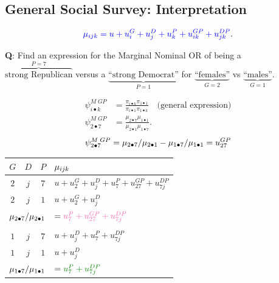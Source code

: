 \documentclass{article}\usepackage[]{graphicx}\usepackage[svgnames]{xcolor}
\let\log\relax%
\begin{document}
\subsection*{General Social Survey: Interpretation}
\[ \textcolor{Blue}{\log{\mu_{ijk}}=u+u_i^G+u_j^D+u_k^P+u_{ik}^{GP}+u_{jk}^{DP}}. \]
\begin{Example}{}
    \textbf{Q}: Find an expression for the Marginal Nominal OR of being a $ \overbrace{\text{strong Republican}}^{P=7} $
    versus a $ \underbrace{\text{``strong Democrat''}}_{P=1} $ for $ \underbrace{\text{``females''}}_{G=2} $ vs $ \underbrace{\text{``males''}}_{G=1} $.
\end{Example}
\begin{align*}
    \psi_{i\bullet k}^{M\; GP} & =\frac{\pi_{i\bullet k}\pi_{1\bullet 1}}{\pi_{i\bullet 1}\pi_{1\bullet k}}\quad\text{(general expression)} \\
    \psi_{2\bullet 7}^{M\; GP} & =\frac{\mu_{2\bullet 7}\mu_{1\bullet 1}}{\mu_{2\bullet 1}\mu_{1\bullet 7}}.
\end{align*}
\[ \log{\psi_{2\bullet 7}^{M\; GP}}=\log{\mu_{2\bullet 7}/\mu_{2\bullet 1}}-\log{\mu_{1\bullet 7}/\mu_{1\bullet 1}}=u_{27}^{GP} \]
\begin{table}[H]
    \centering
    \begin{tabular}{cccl}
        $ G $                                                           & $ D $                                                   & $ P $ & $ \log{\mu_{ijk}} $                             \\
        \midrule
        $ 2 $                                                           & $ j $                                                   & $ 7 $ & $ u+u_2^G+u_j^D+u_7^P+u_{27}^{GP}+u_{7j}^{DP} $ \\
        $ 2 $                                                           & $ j $                                                   & $ 1 $ & $ u+u_2^G+u_j^D $                               \\
        \midrule
        \multicolumn{3}{c}{$ \log{\mu_{2\bullet 7}/\mu_{2\bullet 1}} $} & $ =\textcolor{HotPink}{u_7^P+u_{27}^{GP}+u_{7j}^{DP}} $                                                           \\\\
        \midrule
        $ 1 $                                                           & $ j $                                                   & $ 7 $ & $ u+u_j^D+u_7^P+u_{7j}^{DP} $                   \\
        $ 1 $                                                           & $ j $                                                   & $ 1 $ & $ u+u_j^D $                                     \\
        \midrule
        \multicolumn{3}{c}{$ \log{\mu_{1\bullet 7}/\mu_{1\bullet 1}} $} & $ =\textcolor{Green}{u_7^P+u_{7j}^{DP}} $
    \end{tabular}
\end{table}
\end{document}
